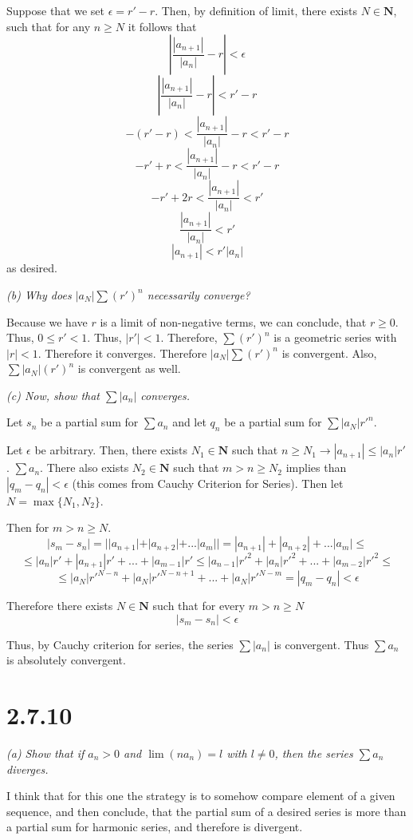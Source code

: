 \documentclass[11pt,oneside,titlepage]{article}
\begin{document}
Suppose that we set $\epsilon = r' - r$. Then, by definition of limit, there
exists $N \in \textbf{N}$, such that for any $n \geq N$ it follows that 
$$|\frac{|a_{n + 1}|}{|a_n|} - r| < \epsilon$$
$$|\frac{|a_{n + 1}|}{|a_n|} - r| < r' - r$$
$$- (r' - r) < \frac{|a_{n + 1}|}{|a_n|} - r < r' - r$$
$$- r' +  r < \frac{|a_{n + 1}|}{|a_n|} - r < r' - r$$
$$- r' + 2r < \frac{|a_{n + 1}|}{|a_n|}  < r'$$
$$\frac{|a_{n + 1}|}{|a_n|}  < r'$$
$$|a_{n + 1}|  < r'|a_n|$$
as desired.

\textit{(b) Why does $|a_N|\sum(r')^n$ necessarily converge? }

Because we have $r$ is a limit of non-negative terms, we can conclude,
that $r \geq 0$. Thus, $0 \leq r'  < 1$. Thus, $|r'| < 1$. Therefore,
$\sum(r')^n$ is a geometric series with $|r| < 1$. Therefore it converges.
Therefore $|a_N| \sum(r')^n$ is convergent. Also, $\sum |a_N| (r')^n$ is
convergent as well.

\textit{(c) Now, show that $\sum |a_n|$ converges.}


Let $s_n$ be a partial sum for $\sum a_n$ and let $q_n$ be a partial sum
for $\sum |a_N| r'^n$.

Let $\epsilon$ be arbitrary. Then, there
exists $N_1 \in \textbf{N}$ such that
$n \geq N_1 \to |a_{n + 1}| \leq |a_n|r'$.
$\sum a_n$. There also exists $N_2 \in \textbf{N}$ such that $m > n \geq N_2$
implies than $|q_m - q_n| < \epsilon$ (this comes from Cauchy Criterion for
Series). Then let  $N = \max\{N_1, N_2\}$.

Then for $m > n \geq N$.
$$|s_m - s_n| = ||a_{n + 1}| + |a_{n + 2}| + ... |a_m|| =
|a_{n + 1}| + |a_{n + 2}| + ... |a_m| \leq$$
$$\leq|a_n|r' + |a_{n + 1}|r' +
... + |a_{m - 1}|r' \leq |a_{n - 1}|r'^2 + |a_{n}|r'^2 + ... +
|a_{m - 2}|r'^2 \leq$$
$$\leq |a_N|r'^{N - n} + |a_N|r'^{N - n + 1} + ... + |a_N|r'^{N - m} =
|q_m - q_n| < \epsilon$$

Therefore there exists $N \in \textbf{N}$ such that for every $m > n \geq N$
$$|s_m - s_n| < \epsilon$$

Thus, by Cauchy criterion for series, the  series $\sum |a_n|$ is convergent.
Thus $\sum a_n$ is absolutely convergent.

\section*{2.7.10}
\textit{(a) Show that if $a_n > 0$ and $\lim(na_n) = l$ with $l \neq 0$,
  then the series $\sum a_n$ diverges. }

I think that for this one the strategy is to somehow compare element
of a given  sequence, and then conclude, that the partial sum of a desired
series is more than a partial sum for harmonic series, and therefore is
divergent.
\end{document}
